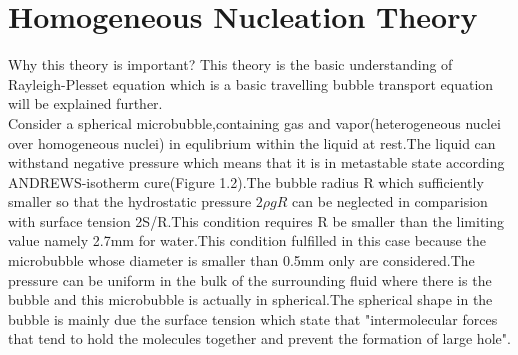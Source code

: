  \section{Homogeneous Nucleation Theory}
 Why this theory is important?
 This theory is the basic understanding of Rayleigh-Plesset equation which is a basic travelling bubble transport equation will be explained further.\\
 Consider a spherical microbubble,containing gas and vapor(heterogeneous nuclei over homogeneous nuclei) in equlibrium within the liquid at rest.The liquid can withstand negative pressure which means 
 that it is in metastable state according ANDREWS-isotherm cure(Figure 1.2).The bubble radius R which sufficiently smaller so that the hydrostatic pressure $2\rho gR$ can be neglected in comparision with 
 surface tension 2S/R.This condition requires R be smaller than the limiting value namely 2.7mm for water.This condition fulfilled in this case because the microbubble whose diameter is smaller than 0.5mm
 only are considered.The pressure can be uniform in the bulk of the surrounding fluid where there is the bubble and this microbubble is actually in spherical.The spherical shape in the bubble is mainly due
 the surface tension which state that "intermolecular forces that tend to hold the molecules together and prevent the formation of large hole".\\
 
